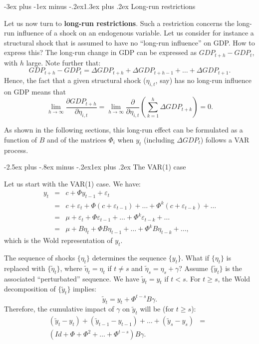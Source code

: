 \documentclass[
  11pt,
]{book}
\makeatletter
\renewcommand\section{\@startsection{section}{1}{\z@}
  {-3ex plus -1ex minus -.2ex}{1.3ex plus .2ex}
  {\normalfont\Large\bfseries\color{TextbookInk}}}
\renewcommand\subsection{\@startsection{subsection}{2}{\z@}
  {-2.5ex plus -.8ex minus -.2ex}{1ex plus .2ex}
  {\normalfont\large\bfseries\color{TextbookInk}}}
\theoremstyle{definition}
\theoremstyle{definition}
\theoremstyle{definition}
\theoremstyle{definition}
\theoremstyle{remark}
\makeatother
\begin{document}
\section{Long-run restrictions}\label{LRrestr}

Let us now turn to \textbf{long-run restrictions}. Such a restriction concerns the long-run influence of a shock on an endogenous variable. Let us consider for instance a structural shock that is assumed to have no ``long-run influence'' on GDP. How to express this? The long-run change in GDP can be expressed as \(GDP_{t+h} - GDP_t\), with \(h\) large. Note further that:
\[
GDP_{t+h} - GDP_t = \Delta GDP_{t+h} +\Delta GDP_{t+h-1} + \dots + \Delta GDP_{t+1}.
\]
Hence, the fact that a given structural shock (\(\eta_{i,t}\), say) has no long-run influence on GDP means that
\[
\lim_{h\rightarrow\infty}\frac{\partial GDP_{t+h}}{\partial \eta_{i,t}} = \lim_{h\rightarrow\infty} \frac{\partial}{\partial \eta_{i,t}}\left(\sum_{k=1}^h \Delta  GDP_{t+k}\right)= 0.
\]

As shown in the following sections, this long-run effect can be formulated as a function of \(B\) and of the matrices \(\Phi_i\) when \(y_t\) (including \(\Delta GDP_t\)) follows a VAR process.

\subsection{The VAR(1) case}\label{the-var1-case}

Let us start with the VAR(1) case. We have:
\begin{eqnarray*}
y_{t} &=& c+\Phi y_{t-1}+\varepsilon_{t}\\
& = & c+\varepsilon_{t}+\Phi(c+\varepsilon_{t-1})+\ldots+\Phi^{k}(c+\varepsilon_{t-k})+\ldots \\
& = & \mu +\varepsilon_{t}+\Phi\varepsilon_{t-1}+\ldots+\Phi^{k}\varepsilon_{t-k}+\ldots \\
& = & \mu +B\eta_{t}+\Phi B\eta_{t-1}+\ldots+\Phi^{k}B\eta_{t-k}+\ldots,
\end{eqnarray*}
which is the Wold representation of \(y_t\).

The sequence of shocks \(\{\eta_t\}\) determines the sequence \(\{y_t\}\). What if \(\{\eta_t\}\) is replaced with \(\{\tilde{\eta}_t\}\), where \(\tilde{\eta}_t=\eta_t\) if \(t \ne s\) and \(\tilde{\eta}_s=\eta_s + \gamma\)? Assume \(\{\tilde{y}_t\}\) is the associated ``perturbated'' sequence. We have \(\tilde{y}_t = y_t\) if \(t<s\). For \(t \ge s\), the Wold decomposition of \(\{\tilde{y}_t\}\) implies:
\[
\tilde{y}_t = y_t + \Phi^{t-s} B \gamma.
\]
Therefore, the cumulative impact of \(\gamma\) on \(\tilde{y}_t\) will be (for \(t \ge s\)):
\begin{eqnarray}
(\tilde{y}_t - y_t) +  (\tilde{y}_{t-1} - y_{t-1}) + \dots +  (\tilde{y}_s - y_s) &=& \nonumber \\
(Id + \Phi + \Phi^2 + \dots + \Phi^{t-s}) B \gamma.&& \label{eq:cumul}
\end{eqnarray}
\end{document}
